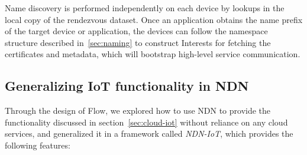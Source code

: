 Name discovery is performed independently on each device by lookups in the local copy of the rendezvous dataset.
Once an application obtains the name prefix of the target device or application, the devices can follow the namespace structure described in~\ref{sec:naming} to construct Interests for fetching the certificates and metadata, which will bootstrap high-level service communication.

\subsection{Generalizing IoT functionality in NDN}

Through the design of Flow, we explored how to use NDN to provide the functionality discussed in section~\ref{sec:cloud-iot} without reliance on any cloud services, and generalized it in a framework called \textit{NDN-IoT}, which provides the following features: 

